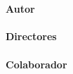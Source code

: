 {\vfill

\begin{large}
\begin{center}
\textoPrimerSubtituloPortadaVal
\mbox{ } \\ \mbox{ } \\ 
{\Large \bfseries Autor}\\
\textbf{\autorPortadaVal}\\[1.0cm]
{\Large \bfseries Directores}\\
\textbf{\directorPortadaVal}\\[0.3cm]
\ifx\colaboradorPortadaVal\empty\else
{\Large \bfseries Colaborador}\\
\textbf{\colaboradorPortadaVal}\\[0.3cm]
\fi
\mbox{ } \\ \mbox{ } \\ 
\textoSegundoSubtituloPortadaVal \\ [0.3em]
\end{center}
\end{large}

\vfill

\begin{large}
\begin{center}
\textbf{\institucionVal}\\[0.2em]
    \mbox{ }  \\
\textbf{\fechaPublicacionVal}
\end{center}
\end{large}


\newpage
\thispagestyle{empty}
%

} %

